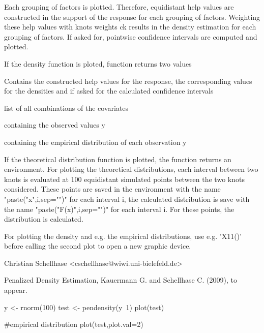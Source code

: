 \begin{Details}\relax
Each grouping of factors is plotted. Therefore, equidistant help values are constructed in the support of the response for each grouping of factors. Weighting these help values with knots weights ck results in the density estimation for each grouping of factors. If asked for, pointwise confidence intervals are computed and plotted.
\end{Details}
\begin{Value}
If the density function is ploted, function returns two values
\begin{ldescription}
\item[\code{help.env}] Contains the constructed help values for the response, the corresponding values for the densities and if asked for the calculated confidence intervals
\item[\code{combi}] list of all combinations of the covariates
\item[\code{y}] containing the observed values y
\item[\code{sum}] containing the empirical distribution of each observation y
\end{ldescription}

If the theoretical distribution function is plotted, the function returns an environment. For plotting the theoretical distributions, each interval between two knots is evaluated at 100 equidistant simulated points between the two knots considered. These points are saved in the environment with the name "paste("x",i,sep="")" for each interval i, the calculated distribution is save with the name "paste("F(x)",i,sep="")" for each interval i. For these points, the distribution is calculated.
\end{Value}
\begin{Note}\relax
For plotting the density and e.g. the empirical distributions, use e.g. 'X11()' before calling the second plot to open a new graphic device.
\end{Note}
\begin{Author}\relax
Christian Schellhase <cschellhase@wiwi.uni-bielefeld.de>
\end{Author}
\begin{References}\relax
Penalized Density Estimation, Kauermann G. and Schellhase C. (2009), to appear.
\end{References}
\begin{Examples}
\begin{ExampleCode}
y <- rnorm(100)
test <- pendensity(y~1)
plot(test)

#empirical distribution
plot(test,plot.val=2)
\end{ExampleCode}
\end{Examples}

